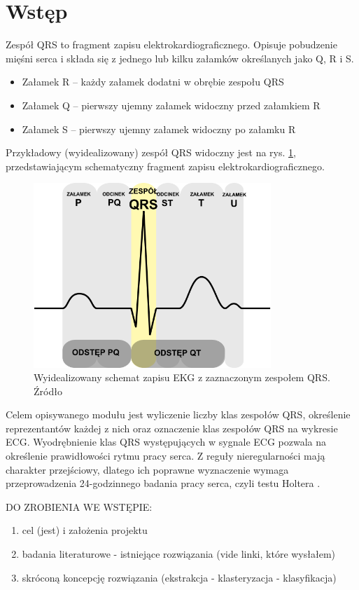 \section{Wstęp}

\qquad Zespół QRS to fragment zapisu elektrokardiograficznego. Opisuje pobudzenie mięśni serca i składa się z jednego lub kilku załamków określanych jako Q, R i S.
\begin{itemize}
	\item Załamek R – każdy załamek dodatni w obrębie zespołu QRS
	\item Załamek Q – pierwszy ujemny załamek widoczny przed załamkiem R
	\item Załamek S – pierwszy ujemny załamek widoczny po załamku R
\end{itemize}
Przykładowy (wyidealizowany) zespół QRS widoczny jest na rys. \ref{fig:QRSComplex}, przedstawiającym schematyczny fragment zapisu elektrokardiograficznego.


\begin{figure}[h]
	\centering
	\includegraphics[width=0.8\textwidth]{Grafika/ZespolQRS}
	\caption{Wyidealizowany schemat zapisu EKG z zaznaczonym zespołem QRS. Źródło  \cite{QRSComplexWiki}}
	\label{fig:QRSComplex}
\end{figure}

\qquad Celem opisywanego modułu jest wyliczenie liczby klas zespołów QRS, określenie reprezentantów każdej z nich oraz oznaczenie klas zespołów QRS na wykresie ECG. Wyodrębnienie klas QRS występujących w sygnale ECG pozwala na określenie prawidłowości rytmu pracy serca. Z reguły nieregularności mają charakter przejściowy, dlatego ich poprawne wyznaczenie wymaga przeprowadzenia 24-godzinnego badania pracy serca, czyli testu Holtera \cite{RaportKoncowy}.

DO ZROBIENIA WE WSTĘPIE:
\begin{enumerate}
	\item cel (jest) i założenia projektu
	\item badania literaturowe - istniejące rozwiązania (vide linki, które wysłałem) 
	\item skróconą koncepcję rozwiązania (ekstrakcja - klasteryzacja - klasyfikacja)
\end{enumerate}